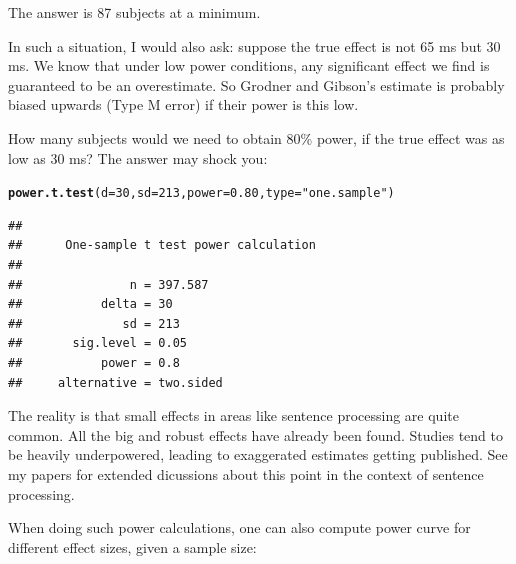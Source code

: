 \documentclass[12pt]{book}\usepackage[]{graphicx}\usepackage[]{color}
\makeatletter
\newcommand{\hlnum}[1]{\textcolor[rgb]{0.686,0.059,0.569}{#1}}%
\newcommand{\hlstr}[1]{\textcolor[rgb]{0.192,0.494,0.8}{#1}}%
\newcommand{\hlstd}[1]{\textcolor[rgb]{0.345,0.345,0.345}{#1}}%
\newcommand{\hlkwc}[1]{\textcolor[rgb]{0.333,0.667,0.333}{#1}}%
\newcommand{\hlkwd}[1]{\textcolor[rgb]{0.737,0.353,0.396}{\textbf{#1}}}%
\newenvironment{kframe}{%
 \def\at@end@of@kframe{}%
 \ifinner\ifhmode%
  \def\at@end@of@kframe{\end{minipage}}%
  \begin{minipage}{\columnwidth}%
 \fi\fi%
 \def\FrameCommand##1{\hskip\@totalleftmargin \hskip-\fboxsep
 \colorbox{shadecolor}{##1}\hskip-\fboxsep
     \hskip-\linewidth \hskip-\@totalleftmargin \hskip\columnwidth}%
 \MakeFramed {\advance\hsize-\width
   \@totalleftmargin\z@ \linewidth\hsize
   \@setminipage}}%
 {\par\unskip\endMakeFramed%
 \at@end@of@kframe}
\newenvironment{knitrout}{}{} %
\makeatother
\begin{document}
The answer is 87 subjects at a minimum. 

In such a situation, I would also ask: suppose the true effect is not 65 ms but 30 ms. We know that under low power conditions, any significant effect we find is guaranteed to be an overestimate. So Grodner and Gibson's estimate is probably biased upwards (Type M error) if their power is this low. 

How many subjects would we need to obtain 80\% power, if the true effect was as low as 30 ms? The answer may shock you:

\begin{knitrout}
\color{fgcolor}\begin{kframe}
\begin{alltt}
\hlkwd{power.t.test}\hlstd{(}\hlkwc{d}\hlstd{=}\hlnum{30}\hlstd{,}\hlkwc{sd}\hlstd{=}\hlnum{213}\hlstd{,}\hlkwc{power}\hlstd{=}\hlnum{0.80}\hlstd{,}\hlkwc{type}\hlstd{=}\hlstr{"one.sample"}\hlstd{)}
\end{alltt}
\begin{verbatim}
## 
##      One-sample t test power calculation 
## 
##               n = 397.587
##           delta = 30
##              sd = 213
##       sig.level = 0.05
##           power = 0.8
##     alternative = two.sided
\end{verbatim}
\end{kframe}
\end{knitrout}

The reality is that small effects in areas like sentence processing are quite common. All the big and robust effects have already been found.
Studies tend to be heavily underpowered, leading to exaggerated estimates getting published. See my papers \cite{VasishthMertzenJaegerGelman2018,JaegerEngelmannVasishth2017} for extended dicussions about this point in the context of sentence processing.

When doing such power calculations, one can also compute power curve for different effect sizes, given a sample size:
\end{document}

